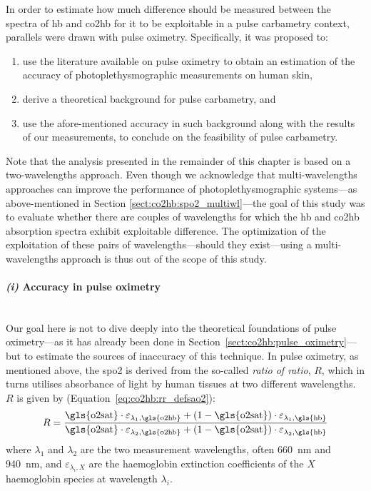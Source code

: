 In order to estimate how much difference should be measured between the spectra of \gls{hb} and \gls{co2hb} for it to be exploitable in a pulse carbametry context, parallels were drawn with pulse oximetry. Specifically, it was proposed to:
\begin{enumerate}[label=\textit{(\roman*)}]
	\item use the literature available on pulse oximetry to obtain an estimation of the accuracy of photoplethysmographic measurements on human skin,
	\item derive a theoretical background for pulse carbametry, and
	\item use the afore-mentioned accuracy in such background along with the results of our measurements, to conclude on the feasibility of pulse carbametry.
\end{enumerate}

Note that the analysis presented in the remainder of this chapter is based on a two-wavelengths approach. Even though we acknowledge that multi-wavelengths approaches can improve the performance of photoplethysmographic systems---as above-mentioned in Section \ref{sect:co2hb:spo2_multiwl}---the goal of this study was to evaluate whether there are couples of wavelengths for which the \gls{hb} and \gls{co2hb} absorption spectra exhibit exploitable difference. The optimization of the exploitation of these pairs of wavelengths---should they exist---using a multi-wavelengths approach is thus out of the scope of this study.

\paragraph{\textit{(i)} Accuracy in pulse oximetry} ~\\

Our goal here is not to dive deeply into the theoretical foundations of pulse oximetry---as it has already been done in Section~\ref{sect:co2hb:pulse_oximetry}---but to estimate the sources of inaccuracy of this technique. In pulse oximetry, as mentioned above, the \gls{spo2} is derived from the so-called \emph{ratio of ratio}, $R$, which in turns utilises absorbance of light by human tissues at two different wavelengths. $R$ is given by (Equation~\ref{eq:co2hb:rr_defsao2}):
\begin{equation}\label{eq:co2hb:rr_defspo2}
	R= \frac{\text{\gls{o2sat}} \cdot \varepsilon_{\lambda_1,\text{\gls{o2hb}}} + (1-\text{\gls{o2sat}})\cdot \varepsilon_{\lambda_1,\text{\gls{hb}}}}{\text{\gls{o2sat}} \cdot \varepsilon_{\lambda_2,\text{\gls{o2hb}}} + (1-\text{\gls{o2sat}})\cdot \varepsilon_{\lambda_2,\text{\gls{hb}}}}
\end{equation}
where $\lambda_1$ and $\lambda_2$ are the two measurement wavelengths, often 660~nm and 940~nm, and $\varepsilon_{\lambda_i, X}$ are the haemoglobin extinction coefficients of the $X$ haemoglobin species at wavelength $\lambda_i$.

